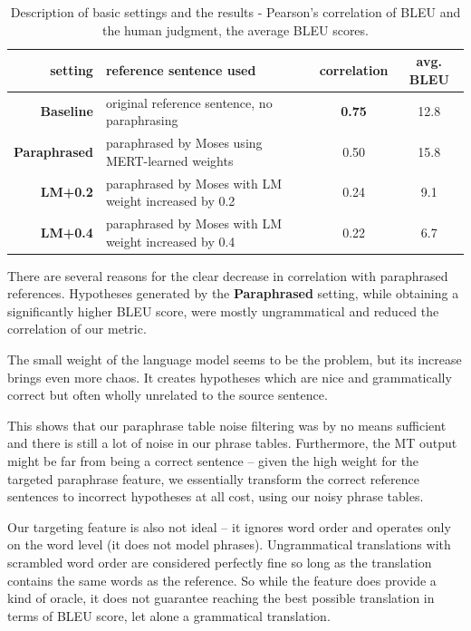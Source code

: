 \documentclass[11pt]{article}
\begin{document}
\begin{table}[ht]
\begin{tabular}{r|l|c|c}
setting & reference sentence used & correlation & avg. BLEU \\
\hline
\textbf{Baseline} & original reference sentence, no paraphrasing & \textbf{0.75} & 12.8 \\
\textbf{Paraphrased} & paraphrased by Moses using MERT-learned weights  & 0.50  & 15.8 \\
\textbf{LM+0.2}  & paraphrased by Moses with LM weight increased by 0.2  & 0.24 & 9.1 \\
\textbf{LM+0.4} & paraphrased by Moses with LM weight increased by 0.4  & 0.22 & 6.7 \\
\end{tabular}
\caption{Description of basic settings and the results - Pearson's correlation of BLEU and the
human judgment, the average BLEU scores.} 
\label{settings}
\end{table}

There are several reasons for the clear decrease in correlation with 
paraphrased references. Hypotheses generated by the \textbf{Paraphrased} 
setting, while obtaining a significantly higher BLEU score, were mostly 
ungrammatical and reduced the correlation of our metric.

The small weight of the language model seems to be the problem, but its 
increase brings even more chaos. It creates hypotheses which are nice and 
grammatically correct but often wholly unrelated to the source sentence.

This shows that our paraphrase table noise filtering was by no means sufficient 
and there is still a lot of noise in our phrase tables. Furthermore, the MT 
output might be far from being a correct sentence -- given the high weight for 
the targeted paraphrase feature, we essentially transform the correct reference 
sentences to incorrect hypotheses at all cost, using our noisy phrase tables.

Our targeting feature is also not ideal -- it ignores word order and operates
only on the word level (it does not model phrases). Ungrammatical translations
with scrambled word order are considered perfectly fine so long as the
translation contains the same words as the reference. So while the feature does
provide a kind of oracle, it does not guarantee reaching the best possible
translation in terms of BLEU score, let alone a grammatical translation.
\end{document}
